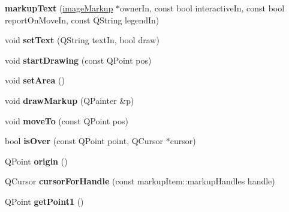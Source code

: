 \begin{DoxyCompactItemize}
\item 
\hypertarget{classmarkupText_ab10f4390437f296224ebc9227363e775}{
{\bfseries markupText} (\hyperlink{classimageMarkup}{imageMarkup} $\ast$ownerIn, const bool interactiveIn, const bool reportOnMoveIn, const QString legendIn)}
\label{classmarkupText_ab10f4390437f296224ebc9227363e775}

\item 
\hypertarget{classmarkupText_af93858c8d0f6af731c012bdef3e9d194}{
void {\bfseries setText} (QString textIn, bool draw)}
\label{classmarkupText_af93858c8d0f6af731c012bdef3e9d194}

\item 
\hypertarget{classmarkupText_a5644687c841f6eb1c844a13040d2453a}{
void {\bfseries startDrawing} (const QPoint pos)}
\label{classmarkupText_a5644687c841f6eb1c844a13040d2453a}

\item 
\hypertarget{classmarkupText_a3c64d2d513ef18ce32466ad03accdc12}{
void {\bfseries setArea} ()}
\label{classmarkupText_a3c64d2d513ef18ce32466ad03accdc12}

\item 
\hypertarget{classmarkupText_abcce7825fe6e9d6b5287ac7b402d785f}{
void {\bfseries drawMarkup} (QPainter \&p)}
\label{classmarkupText_abcce7825fe6e9d6b5287ac7b402d785f}

\item 
\hypertarget{classmarkupText_a9e8c68e748504328598220b9483d443c}{
void {\bfseries moveTo} (const QPoint pos)}
\label{classmarkupText_a9e8c68e748504328598220b9483d443c}

\item 
\hypertarget{classmarkupText_af64454b92fa176a8b7b2e7b1e8e6fb94}{
bool {\bfseries isOver} (const QPoint point, QCursor $\ast$cursor)}
\label{classmarkupText_af64454b92fa176a8b7b2e7b1e8e6fb94}

\item 
\hypertarget{classmarkupText_ae883f3edcba6a3c70bbabaf9ba1ebc5e}{
QPoint {\bfseries origin} ()}
\label{classmarkupText_ae883f3edcba6a3c70bbabaf9ba1ebc5e}

\item 
\hypertarget{classmarkupText_aaf88bc3f975bea3d3cbc2e04a78dd9cb}{
QCursor {\bfseries cursorForHandle} (const markupItem::markupHandles handle)}
\label{classmarkupText_aaf88bc3f975bea3d3cbc2e04a78dd9cb}

\item 
\hypertarget{classmarkupText_a0e1056c41ac8465a0d6257c2b17192bd}{
QPoint {\bfseries getPoint1} ()}
\label{classmarkupText_a0e1056c41ac8465a0d6257c2b17192bd}


\end{DoxyCompactItemize}
